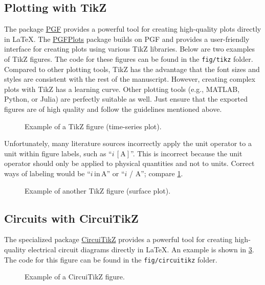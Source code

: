 \subsection{Plotting with TikZ}

The package \href{https://ctan.org/pkg/pgf}{PGF} provides a powerful tool for creating high-quality plots directly in \LaTeX. The \href{https://ctan.org/pkg/pgfplots}{PGFPlots} package builds on PGF and provides a user-friendly interface for creating plots using various TikZ libraries. Below are two examples of TikZ figures. The code for these figures can be found in the \texttt{fig/tikz} folder. Compared to other plotting tools, TikZ has the advantage that the font sizes and styles are consistent with the rest of the manuscript. However, creating complex plots with TikZ has a learning curve. Other plotting tools (e.g., MATLAB, Python, or Julia) are perfectly suitable as well. Just ensure that the exported figures are of high quality and follow the guidelines mentioned above.
\begin{figure}[htb]
	\centering
	
	\caption{Example of a TikZ figure (time-series plot).}
	\label{fig:tikz_example_01}
\end{figure}
\begin{errorbox}[title={Unit operator as part of a figure label}]
	Unfortunately, many literature sources incorrectly apply the unit operator to a unit within figure labels, such as \enquote{$i\, [\mathrm{A}]$}. This is incorrect because the unit operator should only be applied to physical quantities and not to units. Correct ways of labeling would be \enquote{$i\,\text{in}\,\mathrm{A}$} or \enquote{$i$ / $\mathrm{A}$}; compare \cref{fig:tikz_example_01}.
\end{errorbox}

\begin{figure}[htb]
	\centering
	
	\caption{Example of another TikZ figure (surface plot).}
	\label{fig:tikz_example_02}
\end{figure}

\subsection{Circuits with CircuiTikZ}
The specialized package \href{https://ctan.org/pkg/circuitikz}{CircuiTikZ} provides a powerful tool for creating high-quality electrical circuit diagrams directly in \LaTeX. An example is shown in \cref{fig:circuitikz_example}. The code for this figure can be found in the \texttt{fig/circuitikz} folder.
\begin{figure}[htb]
	\centering
	
	\caption{Example of a CircuiTikZ figure.}
	\label{fig:circuitikz_example}
\end{figure}


